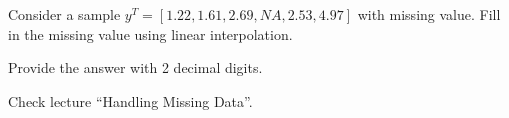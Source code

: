 
\begin{question}
Consider a sample \(y^T = [1.22, 1.61, 2.69, NA, 2.53, 4.97]\) with missing value. Fill in the missing value using linear interpolation.

Provide the answer with 2 decimal digits.
\end{question}

\begin{solution}
Check lecture ``Handling Missing Data''.
\end{solution}

